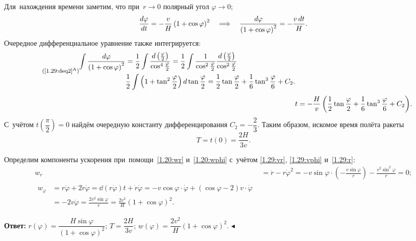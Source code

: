 \documentclass{weekly}
\begin{document}
Для~нахождения времени заметим, что при~$r \to 0$
полярный угол $\varphi \to 0$;
\begin{align}
    \frac{d \varphi}{d t} = -\frac{v}{H} \left(1+\cos\varphi\right)^2 \quad \Longrightarrow \quad
    \frac{d\varphi}{\left(1+\cos\varphi\right)^2} = -\frac{v\,dt}{H}.
        \label{1.29:deq2}
\end{align}
Очередное дифференциальное уравнение также интегрируется:
\begin{align}
\tag*{\footnotesize(\ref{1.29:deq2}$^\text{A}$)}
\begin{split}
    \int \frac{d\varphi}{\left(1+\cos\varphi\right)^2}
        &= \frac{1}{2} \int \frac{d\left(\frac{\varphi}{2}\right)}
            {\cos^4 \frac{\varphi}{2}}
        = \frac{1}{2} \int \frac{1}{\cos^2 \frac{\varphi}{2}}
            \frac{d\left(\frac{\varphi}{2}\right)}
            {\cos^2 \frac{\varphi}{2}} \\
        & \frac{1}{2} \int \left(1 + \tan^2 \frac{\varphi}{2}\right)
            d\tan\frac{\varphi}{2}
        = \frac{1}{2}\tan\frac{\varphi}{2} +
            \frac{1}{6}\tan^3\frac{\varphi}{6} + C_2.
\end{split} \\[1ex]
    &t = -\frac{H}{v} \left( \frac{1}{2}\tan\frac{\varphi}{2} +
            \frac{1}{6}\tan^3\frac{\varphi}{6} + C_2 \right)\!.
\end{align}
С~учётом $t\!\left(\dfrac{\pi}{2}\right) = 0$ найдём
очередную константу дифференцирования $C_2 = -\dfrac{2}{3}$.
Таким образом, искомое время полёта ракеты
\begin{equation}
    T = t(0) = \frac{2H}{3v}.
\end{equation}

Определим компоненты ускорения при~помощи~\eqref{1.20:wr}
и~\eqref{1.20:wphi} с~учётом \eqref{1.29:vr}, \eqref{1.29:vphi}
и~\eqref{1.29:r}:
\begin{align}
    w_r &= \ddot r - r \dot\varphi^2 = -v \sin\varphi \cdot
            \left(-\frac{v \sin\varphi}{r}\right) -
            \frac{v^2 \sin^2\varphi}{r} = 0; \\
\begin{split}
    w_\varphi &= r \ddot\varphi + 2 \dot r \dot\varphi
        = \dd{(r \dot\varphi)}{t} + \dot r \dot\varphi
        = -v \cos\varphi \cdot \dot\varphi +
            (\cos\varphi - 2) v \cdot \dot\varphi \\
        &= -2v \dot\varphi = \frac{2v^2 \sin\varphi}{r}
        = \frac{2v^2}{H} \left( 1 + \cos\varphi \right)^2.
\end{split}
\end{align}

\textbf{Ответ:}\quad
$r(\varphi) =
    \dfrac{H \sin\varphi}{\left( 1 + \cos\varphi \right)^2}$;\qquad
$T = \dfrac{2H}{3v}$;\qquad
$w(\varphi) = \dfrac{2v^2}{H} \left(1 + \cos\varphi\right)^2$.
\hfill $\blacktriangleleft$
\end{document}
